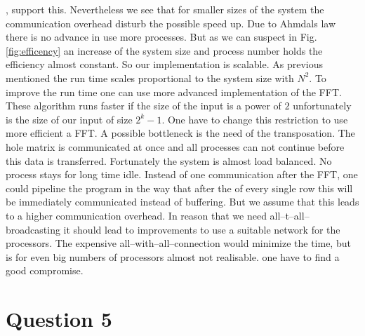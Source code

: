 \begin{figure}[h]
\end{figure}, support this. Nevertheless we see that for smaller sizes of the system the communication overhead disturb the possible speed up. Due to Ahmdals law there is no advance in use more processes. But as we can suspect in Fig.\ref{fig:efficency} an increase of the system size and process number holds the efficiency almost constant. So our implementation is scalable. As previous mentioned the run time scales proportional to the system size with $N^2$. To improve the run time one can use more advanced implementation of the FFT. These algorithm runs faster if the size of the input is a power of $2$ unfortunately is the size of our input of size $2^k - 1$. One have to change this restriction to use more efficient a FFT. A possible bottleneck is the need of the transposation. The hole matrix is communicated at once and all processes can not continue before this data is transferred. Fortunately the system is almost load balanced. No process stays for long time idle. Instead of one communication after the FFT, one could pipeline the program in the way that after the of every single row this will be immediately communicated instead of buffering. But we assume that this leads to a higher communication overhead. In reason that we need all--t--all--broadcasting it should lead to improvements to use a suitable network for the processors. The expensive all--with--all--connection would minimize the time, but is for even big numbers of processors almost not realisable. one have to find a good compromise. 




\section*{Question 5}

